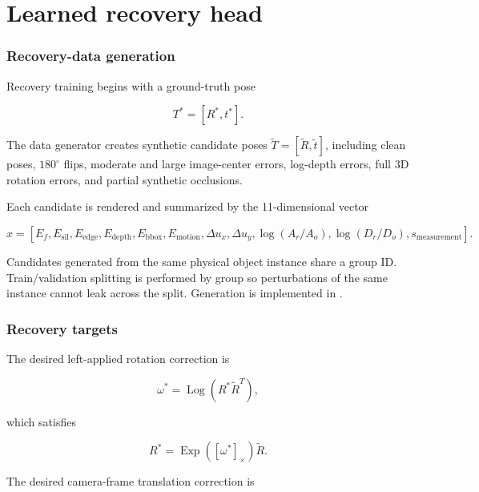 \documentclass[11pt]{article}
\newcommand{\Exp}{\operatorname{Exp}}
\newcommand{\Log}{\operatorname{Log}}
\begin{document}
\part{Learned recovery head}

\section{Recovery-data generation}

Recovery training begins with a ground-truth pose

\begin{equation}
T^*=[R^*,t^*].
\end{equation}

The data generator creates synthetic candidate poses
$\widetilde T=[\widetilde R,\widetilde t]$, including clean poses,
$180^\circ$ flips, moderate and large image-center errors, log-depth errors,
full 3D rotation errors, and partial synthetic occlusions.

Each candidate is rendered and summarized by the 11-dimensional vector

\begin{equation}
x=\left[
E_f,E_{\mathrm{sil}},E_{\mathrm{edge}},E_{\mathrm{depth}},
E_{\mathrm{bbox}},E_{\mathrm{motion}},
\Delta u_x,\Delta u_y,
\log(A_r/A_o),
\log(D_r/D_o),
s_{\mathrm{measurement}}
\right].
\end{equation}

Candidates generated from the same physical object instance share a group ID.
Train/validation splitting is performed by group so perturbations of the same
instance cannot leak across the split. Generation is implemented in
.

\section{Recovery targets}

The desired left-applied rotation correction is

\begin{equation}
\omega^*=\Log\left(R^*\widetilde R^T\right),
\end{equation}

which satisfies

\begin{equation}
R^*=\Exp([\omega^*]_\times)\widetilde R.
\end{equation}

The desired camera-frame translation correction is
\end{document}
